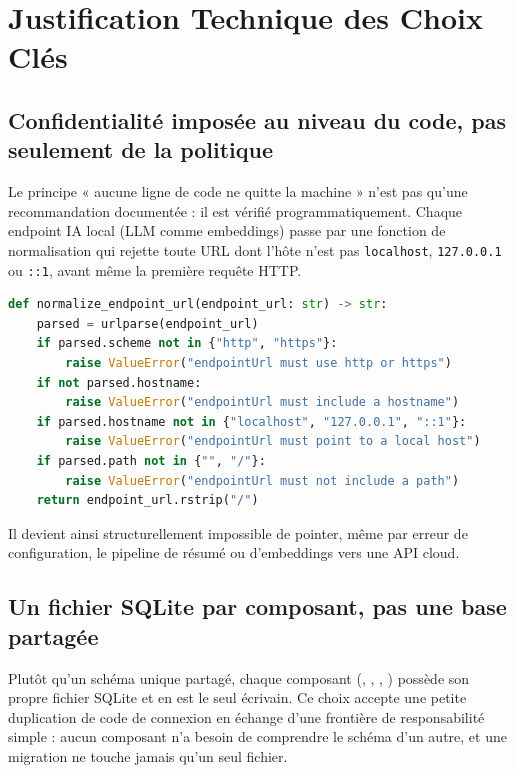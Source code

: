 \documentclass[12pt,a4paper]{report}
\begin{document}
\section{Justification Technique des Choix Clés}

\subsection{Confidentialité imposée au niveau du code, pas seulement de la politique}
Le principe « aucune ligne de code ne quitte la machine » n'est pas qu'une
recommandation documentée : il est vérifié programmatiquement. Chaque endpoint
IA local (LLM comme embeddings) passe par une fonction de normalisation qui rejette
toute URL dont l'hôte n'est pas \texttt{localhost}, \texttt{127.0.0.1} ou
\texttt{::1}, avant même la première requête HTTP.

\begin{lstlisting}[language=python, caption={Validation stricte de l'endpoint local (\texttt{src/local\_llm/models.py})}]
def normalize_endpoint_url(endpoint_url: str) -> str:
    parsed = urlparse(endpoint_url)
    if parsed.scheme not in {"http", "https"}:
        raise ValueError("endpointUrl must use http or https")
    if not parsed.hostname:
        raise ValueError("endpointUrl must include a hostname")
    if parsed.hostname not in {"localhost", "127.0.0.1", "::1"}:
        raise ValueError("endpointUrl must point to a local host")
    if parsed.path not in {"", "/"}:
        raise ValueError("endpointUrl must not include a path")
    return endpoint_url.rstrip("/")
\end{lstlisting}

Il devient ainsi structurellement impossible de pointer, même par erreur de
configuration, le pipeline de résumé ou d'embeddings vers une API cloud.

\subsection{Un fichier SQLite par composant, pas une base partagée}
\begin{sloppypar}
Plutôt qu'un schéma unique partagé, chaque composant (,
, , ) possède
son propre fichier SQLite et en est le seul écrivain. Ce choix accepte une petite
duplication de code de connexion en échange d'une frontière de responsabilité
simple : aucun composant n'a besoin de comprendre le schéma d'un autre, et une
migration ne touche jamais qu'un seul fichier.
\end{sloppypar}
\end{document}
